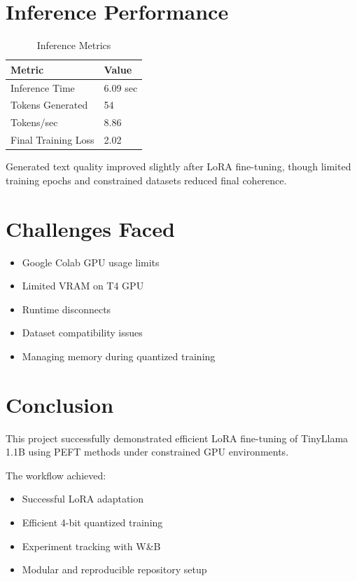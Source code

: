 \documentclass[12pt]{article}
\begin{document}

\section{Inference Performance}

\begin{table}[H]
\centering
\begin{tabular}{ll}
\toprule
Metric & Value \\
\midrule
Inference Time & 6.09 sec \\
Tokens Generated & 54 \\
Tokens/sec & 8.86 \\
Final Training Loss & 2.02 \\
\bottomrule
\end{tabular}
\caption{Inference Metrics}
\end{table}

Generated text quality improved slightly after LoRA fine-tuning, though limited training epochs and constrained datasets reduced final coherence.


\section{Challenges Faced}

\begin{itemize}
    \item Google Colab GPU usage limits
    \item Limited VRAM on T4 GPU
    \item Runtime disconnects
    \item Dataset compatibility issues
    \item Managing memory during quantized training
\end{itemize}


\section{Conclusion}

This project successfully demonstrated efficient LoRA fine-tuning of TinyLlama 1.1B using PEFT methods under constrained GPU environments.

The workflow achieved:
\begin{itemize}
    \item Successful LoRA adaptation
    \item Efficient 4-bit quantized training
    \item Experiment tracking with W\&B
    \item Modular and reproducible repository setup
\end{itemize}
\end{document}
